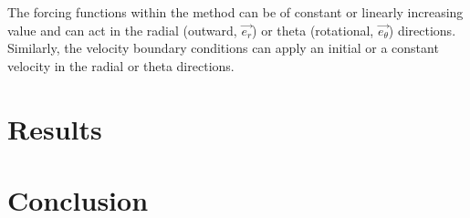 \documentclass[12pt,a4paper]{article}
\begin{document}
The forcing functions within the method can be of constant or linearly increasing value and can act in the radial (outward, $\vec{e_{r}}$) or theta (rotational, $\vec{e_{\theta}}$) directions. Similarly, the velocity boundary conditions can apply an initial or a constant velocity in the radial or theta directions.

\section{Results}

\section{Conclusion}



\end{document}
